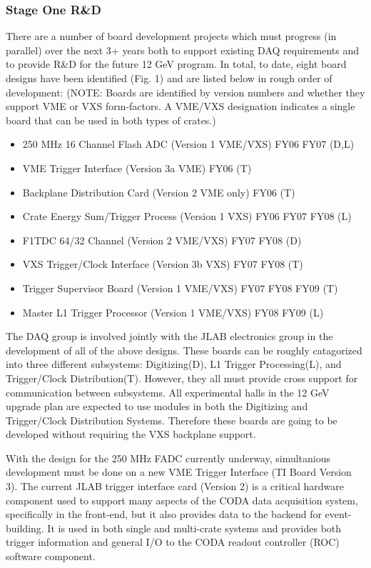 \documentclass[10pt]{article}
\begin{document}
\subsubsection*{Stage One R\&D}

There are a number of board development projects which must progress (in parallel) over the next 3+
years both to support existing DAQ requirements and to provide R\&D for the future 12 GeV program.
In total, to date, eight board designs have been identified (Fig. 1) and are listed below in rough 
order of development:
(NOTE: Boards are identified by version numbers and whether they support VME or VXS form-factors. A
VME/VXS designation indicates a single board that can be used in both types of crates.)
\begin{itemize}
\item 250 MHz 16 Channel Flash ADC (Version 1 VME/VXS)  FY06 FY07           (D,L)
\item VME Trigger Interface (Version 3a VME)            FY06                (T)
\item Backplane Distribution Card (Version 2 VME only)  FY06                (T)
\item Crate Energy Sum/Trigger Process (Version 1 VXS)  FY06 FY07 FY08      (L)
\item F1TDC 64/32 Channel (Version 2 VME/VXS)                FY07 FY08      (D)
\item VXS Trigger/Clock Interface (Version 3b VXS)           FY07 FY08      (T)
\item Trigger Supervisor Board (Version 1 VME/VXS)           FY07 FY08 FY09 (T)
\item Master L1 Trigger Processor (Version 1 VME/VXS)             FY08 FY09 (L)
\end{itemize}

The DAQ group is involved jointly with the JLAB electronics group in the 
development of all of the above designs. These boards can be roughly catagorized into
three different subsystems: Digitizing(D), L1 Trigger Processing(L), and Trigger/Clock 
Distribution(T). However, they all must provide cross support for communication between subsystems.
All experimental halls in the 12 GeV upgrade plan are expected to use modules in both
the Digitizing and Trigger/Clock Distribution Systems. Therefore these boards are going
to be developed without requiring the VXS backplane support.

With the design for the 250 MHz FADC currently underway, simultanious development must be 
done on a new VME Trigger Interface (TI Board Version 3). The current JLAB trigger interface 
card (Version 2) is a critical hardware component used to support many aspects of the CODA data 
acquisition system, specifically in the front-end, but it also provides data 
to the backend for event-building. It is used in both single and multi-crate systems 
and provides both trigger information and general I/O to the CODA readout controller (ROC) 
software component.
\end{document}
